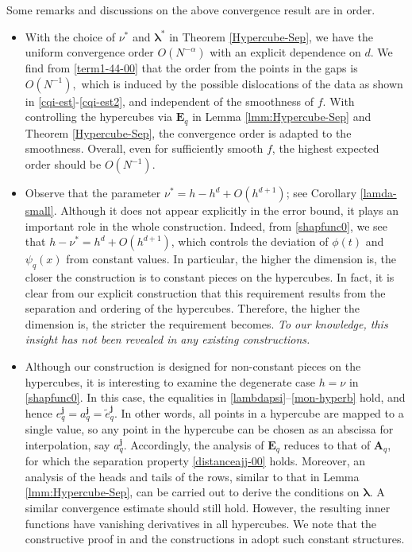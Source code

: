 \documentclass[10pt,reqno,final]{amsart}
\theoremstyle{remark}
\theoremstyle{definition}
\newcommand{\bs}[1]{\boldsymbol{#1}}
\newcommand{\wll}[1]{#1}
\begin{document}
\wll{Some remarks and discussions on the above convergence result are in order. 
\begin{itemize}
\item[(i)]  With the choice of $\nu^*$ and 
$\bs \lambda^*$ in Theorem \ref{Hypercube-Sep}, we have the  uniform convergence order $O(N^{-\alpha})$ 
with an explicit dependence on $d.$ We find from \eqref{term1-44-00} that the order from the points in the gaps is $O(N^{-1}),$  which is induced by the possible dislocations of the data as shown in \eqref{cqi-est}-\eqref{cqi-est2}, and independent of the smoothness of $f$. With 
controlling the hypercubes via $\bs E_q$ in Lemma \ref{lmm:Hypercube-Sep} and Theorem \ref{Hypercube-Sep},   the convergence order is adapted to the smoothness.   Overall, even for sufficiently smooth $f$, the highest expected order should be $O(N^{-1}).$     
\smallskip
\item[(ii)] Observe that the parameter $\nu^*=h-h^d+O(h^{d+1})$; see Corollary \ref{lamda-small}. Although it does not appear explicitly in the error bound, it plays an important role in the whole construction. Indeed, from \eqref{shapfunc0}, we see that $h-\nu^*=h^d+O(h^{d+1})$, which controls the deviation of $\phi(t)$ and $\psi_q(x)$ from constant values. In particular, the higher the dimension is, the closer the construction is to constant pieces on the hypercubes. In fact, it is clear from our explicit construction that this requirement results from the separation and ordering of the hypercubes. Therefore, the higher the dimension is, the stricter the requirement becomes.  {\em To our knowledge, this insight has not been revealed in any existing constructions.} 
\smallskip
\item[(iii)] Although our construction is designed for non-constant pieces on the hypercubes, it is interesting to examine the degenerate case $h=\nu$ in \eqref{shapfunc0}.  
In this case, the equalities in \eqref{lambdapsi}--\eqref{mon-hyperb} hold, and hence $e^{\bs j}_q=a^{\bs j}_q=\tilde e^{\bs j}_q$. In other words, all points in a hypercube are mapped to a single value, so any point in the hypercube can be chosen as an abscissa for interpolation, say $a_q^{\bs j}$. Accordingly, the analysis of $\bs E_q$ reduces to that of $\bs A_q$, for which the separation property \eqref{distanceajj-00} holds. Moreover, an analysis of the heads and tails of the rows, similar to that in Lemma \ref{lmm:Hypercube-Sep}, can be carried out to derive the conditions on $\bs\lambda$. A similar convergence estimate should still hold. However, the resulting inner functions have vanishing derivatives in all hypercubes. We note that the constructive proof in \cite{Kahane1975} and the constructions in \cite{Igelnik2003} adopt such constant structures.
\end{itemize}
}
\end{document}

